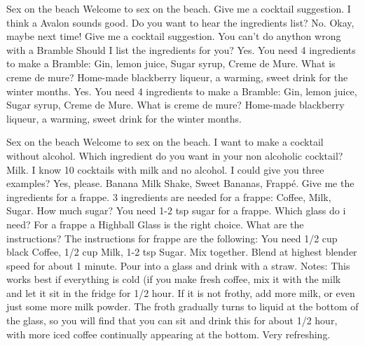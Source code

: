 \documentclass[12pt,letterpaper]{article}
\begin{document}
\begin{dialogue}
	 Sex on the beach
	 Welcome to sex on the beach.
	 Give me a cocktail suggestion.
	 I think a Avalon sounds good. Do you want to hear the ingredients list?
	 No.
	 Okay, maybe next time!
	 Give me a cocktail suggestion.
	 You can't do anython wrong with a Bramble Should I list the ingredients for you?
	 Yes.
	 You need 4 ingredients to make a Bramble: Gin, lemon juice, Sugar syrup, Creme de Mure.
	 What is creme de mure?
	 Home-made blackberry liqueur, a warming, sweet drink for the winter months.
	 Yes.
	 You need 4 ingredients to make a Bramble: Gin, lemon juice, Sugar syrup, Creme de Mure.
	 What is creme de mure?
	 Home-made blackberry liqueur, a warming, sweet drink for the winter months.
	
\end{dialogue}

\begin{dialogue}
	 Sex on the beach
	 Welcome to sex on the beach.
	 I want to make a cocktail without alcohol.
	 Which ingredient do you want in your non alcoholic cocktail?
	 Milk.
	 I know 10 cocktails with milk and no alcohol. I could give you three examples?
	 Yes, please.
	 Banana Milk Shake, Sweet Bananas, Frappé.
	 Give me the ingredients for a frappe.
	 3 ingredients are needed for a frappe: Coffee, Milk, Sugar.
	 How much sugar?
	 You need 1-2 tsp sugar for a frappe.
	 Which glass do i need?
	 For a frappe a Highball Glass is the right choice.
	 What are the instructions?
	 The instructions for frappe are the following: You need 1/2 cup black Coffee, 1/2 cup Milk, 1-2 tsp Sugar. Mix together. Blend at highest blender speed for about 1 minute. Pour into a glass and drink with a straw. Notes: This works best if everything is cold (if you make fresh coffee, mix it with the milk and let it sit in the fridge for 1/2 hour. If it is not frothy, add more milk, or even just some more milk powder. The froth gradually turns to liquid at the bottom of the glass, so you will find that you can sit and drink this for about 1/2 hour, with more iced coffee continually appearing at the bottom. Very refreshing.
	
\end{dialogue}
\end{document}
